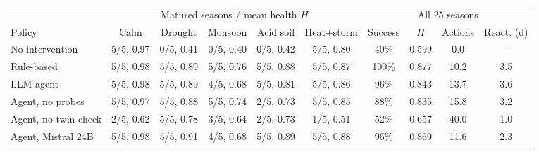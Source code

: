 \begin{tabular}{@{}lccccccccc@{}}
\toprule
& \multicolumn{5}{c}{Matured seasons / mean health $H$} & \multicolumn{4}{c}{All 25 seasons} \\
\cmidrule(lr){2-6}\cmidrule(l){7-10}
Policy & Calm & Drought & Monsoon & Acid soil & Heat+storm & Success & $H$ & Actions & React. (d) \\
\midrule
No intervention & 5/5, 0.97 & 0/5, 0.41 & 0/5, 0.40 & 0/5, 0.42 & 5/5, 0.80 & 40\% & 0.599 & 0.0 & -- \\
Rule-based & 5/5, 0.98 & 5/5, 0.89 & 5/5, 0.76 & 5/5, 0.88 & 5/5, 0.87 & 100\% & 0.877 & 10.2 & 3.5 \\
\midrule
LLM agent & 5/5, 0.98 & 5/5, 0.89 & 4/5, 0.68 & 5/5, 0.81 & 5/5, 0.86 & 96\% & 0.843 & 13.7 & 3.6 \\
Agent, no probes & 5/5, 0.97 & 5/5, 0.88 & 5/5, 0.74 & 2/5, 0.73 & 5/5, 0.85 & 88\% & 0.835 & 15.8 & 3.2 \\
Agent, no twin check & 2/5, 0.62 & 5/5, 0.78 & 3/5, 0.64 & 2/5, 0.73 & 1/5, 0.51 & 52\% & 0.657 & 40.0 & 1.0 \\
Agent, Mistral 24B & 5/5, 0.98 & 5/5, 0.91 & 4/5, 0.68 & 5/5, 0.89 & 5/5, 0.88 & 96\% & 0.869 & 11.6 & 2.3 \\
\bottomrule
\end{tabular}
